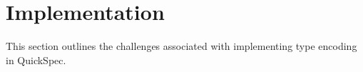 \section{Implementation}

This section outlines the challenges associated with
implementing type encoding in QuickSpec.
